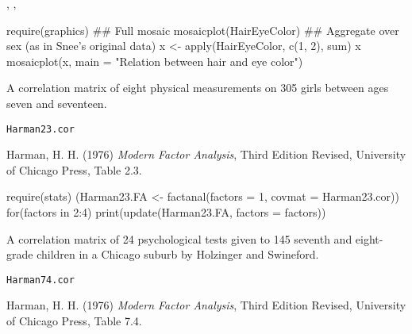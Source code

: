%
\begin{SeeAlso}\relax
{},
,
\end{SeeAlso}
%
\begin{Examples}
\begin{ExampleCode}
require(graphics)
## Full mosaic
mosaicplot(HairEyeColor)
## Aggregate over sex (as in Snee's original data)
x <- apply(HairEyeColor, c(1, 2), sum)
x
mosaicplot(x, main = "Relation between hair and eye color")
\end{ExampleCode}
\end{Examples}
%
\begin{Description}\relax
A correlation matrix of eight physical measurements on 305 girls between
ages seven and seventeen.
\end{Description}
%
\begin{Usage}
\begin{verbatim}
Harman23.cor
\end{verbatim}
\end{Usage}
%
\begin{Source}\relax
Harman, H. H. (1976)
\emph{Modern Factor Analysis}, Third Edition Revised,
University of Chicago Press, Table 2.3.
\end{Source}
%
\begin{Examples}
\begin{ExampleCode}
require(stats)
(Harman23.FA <- factanal(factors = 1, covmat = Harman23.cor))
for(factors in 2:4) print(update(Harman23.FA, factors = factors))
\end{ExampleCode}
\end{Examples}
%
\begin{Description}\relax
A correlation matrix of 24 psychological tests given to 145 seventh and
eight-grade children in a Chicago suburb by Holzinger and Swineford.
\end{Description}
%
\begin{Usage}
\begin{verbatim}
Harman74.cor
\end{verbatim}
\end{Usage}
%
\begin{Source}\relax
Harman, H. H. (1976)
\emph{Modern Factor Analysis}, Third Edition Revised,
University of Chicago Press, Table 7.4.
\end{Source}
